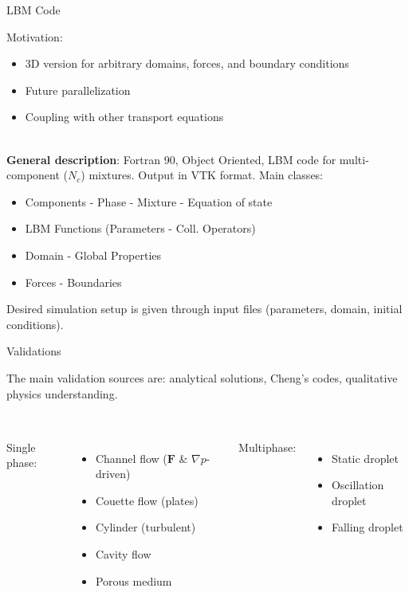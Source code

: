 \documentclass[8pt]{beamer}
\begin{document}
	\begin{frame}{LBM Code}
		
		Motivation: 
		\begin{itemize}
			\item 3D version for arbitrary domains, forces, and boundary conditions
			\item Future parallelization
			\item Coupling with other transport equations
		\end{itemize}
	
		~\\\textbf{General description}: Fortran 90, Object Oriented, LBM code for multi-component ($N_c$) mixtures. Output in VTK format. Main classes:
		\begin{itemize}
			\item Components - Phase - Mixture - Equation of state
			\item LBM Functions (Parameters - Coll. Operators) 
			\item Domain - Global Properties
			\item Forces - Boundaries
		\end{itemize}
		Desired simulation setup is given through input files (parameters, domain, initial conditions).
	\end{frame}
	
	\begin{frame}{Validations}
		
		The main validation sources are: analytical solutions, Cheng's codes, qualitative physics understanding.\\~\\

		
		\begin{columns}[T]
			
			Single phase:
			\begin{itemize}
				\item Channel flow ($\mathbf{F}$ \& $\nabla p$-driven)
				\item Couette flow (plates)
				\item Cylinder (turbulent)
				\item Cavity flow
				\item Porous medium
			\end{itemize}
			
			Multiphase:
			\begin{itemize}
				\item Static droplet
				\item Oscillation droplet
				\item Falling droplet
			\end{itemize}
		\end{columns}
	\end{frame}
\end{document}
